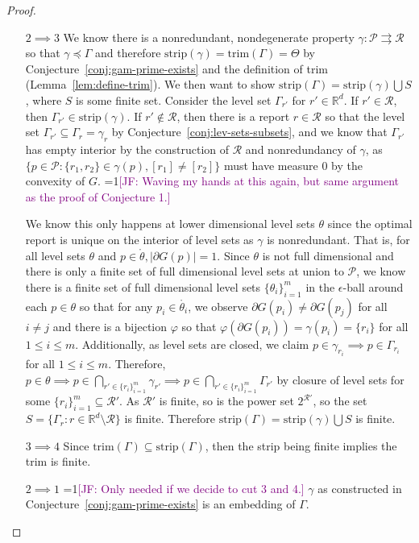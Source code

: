 \documentclass[12pt]{article}
\newcommand{\Comments}{1}
\newcommand{\mynote}[2]{\ifnum\Comments=1\textcolor{#1}{#2}\fi}
\newcommand{\jessie}[1]{\mynote{purple}{[JF: #1]}}
\newcommand{\reals}{\mathbb{R}}
\renewcommand{\P}{\mathcal{P}}
\newcommand{\R}{\mathcal{R}}
\newcommand{\inter}[1]{\mathring{#1}}%
\newcommand{\toto}{\rightrightarrows}
\newcommand{\trim}{\mathrm{trim}}
\newcommand{\strip}{\mathrm{strip}}
\begin{document}
\begin{proof}
\begin{enumerate}
\item [$2 \implies 3$]
	We know there is a nonredundant, nondegenerate property $\gamma : \P \toto \R$ so that $\gamma \preceq \Gamma$ and therefore $\strip(\gamma) = \trim(\Gamma) = \Theta$ by Conjecture~\ref{conj:gam-prime-exists} and the definition of trim (Lemma~\ref{lem:define-trim}).
	We then want to show $\strip(\Gamma) = \strip(\gamma) \bigcup S$, where $S$ is some finite set.
	Consider the level set $\Gamma_{r'}$ for $r' \in \reals^d$.
	If $r' \in \R$, then $\Gamma_{r'} \in \strip(\gamma)$.
	If $r' \not \in \R$, then there is a report $r \in \R$ so that the level set $\Gamma_{r'} \subseteq \Gamma_r = \gamma_r$ by Conjecture~\ref{conj:lev-sets-subsets}, and we know that $\Gamma_{r'}$ has empty interior by the construction of $\R$ and nonredundancy of $\gamma$, as $\{p \in \P: \{r_1, r_2\} \in \gamma(p), [r_1] \neq [r_2] \}$ must have measure $0$ by the convexity of $G$.
	\jessie{Waving my hands at this again, but same argument as the proof of Conjecture 1.}

			
	We know this only happens at lower dimensional level sets $\theta$ since the optimal report is unique on the interior of level sets as $\gamma$ is nonredundant.
	That is, for all level sets $\theta$ and $p \in \inter \theta, |\partial G(p)| = 1$.
	Since $\theta$ is not full dimensional and there is only a finite set of full dimensional level sets at union to $\P$, we know there is a finite set of full dimensional level sets $\{\theta_i\}_{i=1}^m$ in the $\epsilon$-ball around each $p \in \theta$ so that for any $p_i \in \inter{\theta_i}$, we observe $\partial G(p_i) \neq \partial G(p_j)$ for all $i \neq j$ and there is a bijection $\varphi$ so that $\varphi(\partial G(p_i)) = \gamma(p_i) = \{r_i\}$ for all $1 \leq i \leq m$.
	Additionally, as level sets are closed, we claim $p \in \gamma_{r_i} \implies p \in \Gamma_{r_i}$ for all $1 \leq i \leq m$.
	Therefore, $p \in \theta \implies p \in \bigcap_{r' \in \{r_i\}_{i=1}^m} \gamma_{r'}\implies p \in \bigcap_{r' \in \{r_i\}_{i=1}^m} \Gamma_{r'}$ by closure of level sets for some $\{r_i\}_{i=1}^m \subseteq \R'$.
	As $\R'$ is finite, so is the power set $2^{\R'}$, so the set $S = \{\Gamma_r : r \in \reals^d \setminus \R \}$ is finite.
	Therefore $\strip(\Gamma) = \strip(\gamma) \bigcup S$ is finite. 
		

\item [$3 \implies 4$]
Since $\trim(\Gamma) \subseteq \strip(\Gamma)$, then the strip being finite implies the trim is finite.

\item[$2 \implies 1$]
\jessie{Only needed if we decide to cut 3 and 4.}
$\gamma$ as constructed in Conjecture~\ref{conj:gam-prime-exists} is an embedding of $\Gamma$.
\end{enumerate} 

\end{proof}
\end{document}
